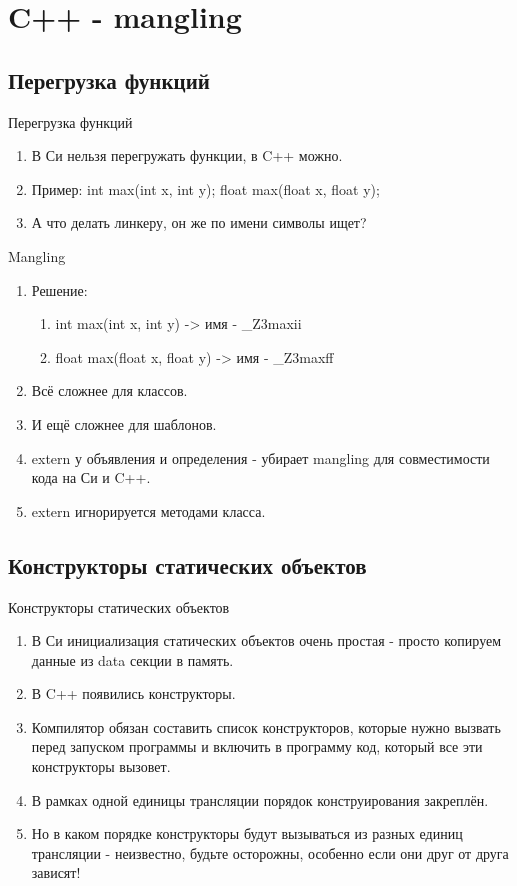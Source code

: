 \documentclass[10pt]{beamer}
\begin{document}
\section{C++ - mangling}
\subsection{Перегрузка функций}
\begin{frame}{Перегрузка функций}
\begin{enumerate}
\item В Си нельзя перегружать функции, в C++ можно.
\item Пример: int max(int x, int y); float max(float x, float y);
\item А что делать линкеру, он же по имени символы ищет?
\end{enumerate}
\end{frame}

\begin{frame}{Mangling}
\begin{enumerate}
\item Решение: {
\begin{enumerate}
    \item int max(int x, int y) -> имя - \_Z3maxii
    \item float max(float x, float y) -> имя - \_Z3maxff
\end{enumerate}
}
\item Всё сложнее для классов.
\item И ещё сложнее для шаблонов.
\item extern  у объявления и определения - убирает mangling для совместимости кода на Си и C++.
\item extern  игнорируется методами класса.
\end{enumerate}
\end{frame}

\subsection{Конструкторы статических объектов}
\begin{frame}{Конструкторы статических объектов}
\begin{enumerate}
\item В Си инициализация статических объектов очень простая - просто копируем данные из data секции в память.
\item В C++ появились конструкторы.
\item Компилятор обязан составить список конструкторов, которые нужно вызвать перед запуском программы и включить в программу код, который все эти конструкторы вызовет.
\item В рамках одной единицы трансляции порядок конструирования закреплён.
\item Но в каком порядке конструкторы будут вызываться из разных единиц трансляции - неизвестно, будьте осторожны, особенно если они друг от друга зависят!
\end{enumerate}
\end{frame}
\end{document}
